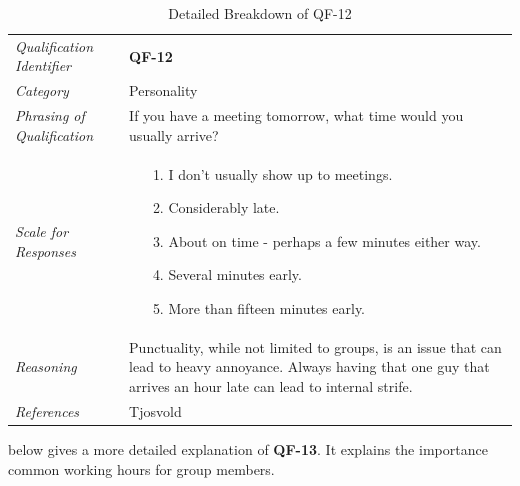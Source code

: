 \documentclass[12pt,letterpaper]{article}
\begin{document}
\begin{table}[H]
	\caption{Detailed Breakdown of QF-12}
	\begin{tabu} to 
		\toprule
		Qualification Identifier & {\bf QF-12}\\
		Category & Personality \\
		Phrasing of Qualification & If you have a meeting tomorrow, what time would you usually arrive? \\
		Scale for Responses &
		\begin{minipage}[t]{\linewidth}
			\begin{enumerate}
				\item[1.] I don't usually show up to meetings.
				\item[2.] Considerably late.
				\item[3.] About on time - perhaps a few minutes either way.
				\item[4.] Several minutes early.
				\item[5.] More than fifteen minutes early.
			\end{enumerate}
		\end{minipage}\\
		Reasoning & Punctuality, while not limited to groups, is an issue that can lead to heavy annoyance. Always having that one guy that arrives an hour late can lead to internal strife.\\
		References & Tjosvold\cite{tjosvold}\\
		\toprule
	\end{tabu}
\end{table}

\newpage{}

 below gives a more detailed explanation of {\bf QF-13}. It explains the importance common working hours for group members.
\end{document}
